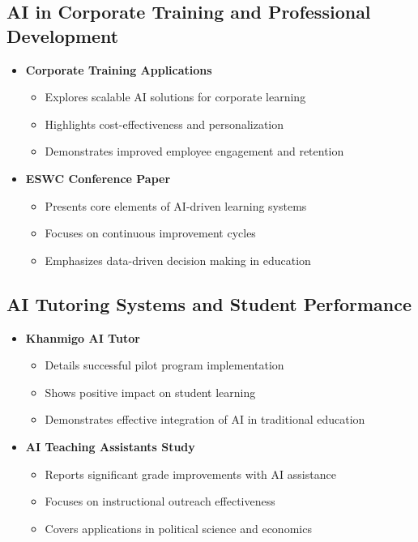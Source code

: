 \subsection{AI in Corporate Training and Professional Development}
\begin{itemize}
    \item \textbf{Corporate Training Applications} \cite{corporate2024}
        \begin{itemize}
            \item Explores scalable AI solutions for corporate learning
            \item Highlights cost-effectiveness and personalization
            \item Demonstrates improved employee engagement and retention
        \end{itemize}
    
    \item \textbf{ESWC Conference Paper} \cite{eswc2024}
        \begin{itemize}
            \item Presents core elements of AI-driven learning systems
            \item Focuses on continuous improvement cycles
            \item Emphasizes data-driven decision making in education
        \end{itemize}
\end{itemize}

\subsection{AI Tutoring Systems and Student Performance}
\begin{itemize}
    \item \textbf{Khanmigo AI Tutor} \cite{khanmigo2024}
        \begin{itemize}
            \item Details successful pilot program implementation
            \item Shows positive impact on student learning
            \item Demonstrates effective integration of AI in traditional education
        \end{itemize}
    
    \item \textbf{AI Teaching Assistants Study} \cite{govtech2024}
        \begin{itemize}
            \item Reports significant grade improvements with AI assistance
            \item Focuses on instructional outreach effectiveness
            \item Covers applications in political science and economics
        \end{itemize}
\end{itemize}


